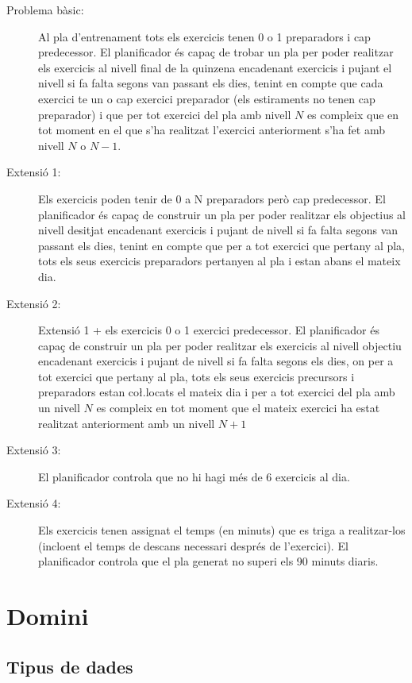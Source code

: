 \documentclass[a4paper,12pt, UTF-8]{article}
\begin{document}
\begin{description}
	\item[Problema bàsic:] Al pla d'entrenament tots els exercicis tenen 0 o 1 preparadors i cap predecessor. El planificador és capaç de trobar un pla per poder realitzar els exercicis al nivell final de la quinzena encadenant exercicis i pujant el nivell si fa falta segons van passant els dies, tenint en compte que cada exercici te un o cap exercici preparador (els estiraments no tenen cap preparador) i que per tot exercici del pla amb nivell $N$ es compleix que en tot moment en el que s'ha realitzat l'exercici anteriorment s'ha fet amb nivell $N$ o $N - 1$.
	\item[Extensió 1:] Els exercicis poden tenir de 0 a N preparadors però cap predecessor. El planificador és capaç de construir un pla per poder realitzar els objectius al nivell desitjat encadenant exercicis i pujant de nivell si fa falta segons van passant els dies, tenint en compte que per a tot exercici que pertany al pla, tots els seus exercicis preparadors pertanyen al pla i estan abans el mateix dia.
	\item[Extensió 2:] Extensió 1 + 	els exercicis 0 o 1 exercici predecessor. El planificador és capaç de construir un pla per poder realitzar els exercicis al nivell objectiu encadenant exercicis i pujant de nivell si fa falta segons els dies, on per a tot exercici que pertany al pla, tots els seus exercicis precursors i preparadors estan co\l.locats el mateix dia i per a tot exercici del pla amb un nivell $N$ es compleix en tot moment que el mateix exercici ha estat realitzat anteriorment amb un nivell $N + 1$
	\item[Extensió 3:] El planificador controla que no hi hagi més de 6 exercicis al dia.
	\item[Extensió 4:] Els exercicis tenen assignat el temps (en minuts) que es triga a realitzar-los (incloent el temps de descans necessari després de l'exercici). El planificador controla que el pla generat no superi els 90 minuts diaris. 
\end{description}

\section{Domini}

\subsection{Tipus de dades}
\end{document}
